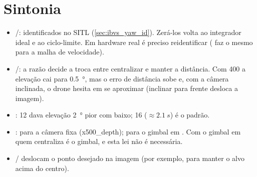 \section{Sintonia}
\begin{itemize}
  \item {}/: identificados no SITL
        (\autoref{sec:ibvs_yaw_id}). Zerá-los volta ao integrador ideal e ao ciclo-limite.
        Em hardware real é preciso reidentificar ( faz o mesmo para a
        malha de velocidade).
  \item {}/: a razão decide a troca entre centralizar e manter
        a distância. Com 400 a elevação cai para \SI{0,5}{\degree}, mas o erro de distância sobe e,
        com a câmera inclinada, o drone hesita em se aproximar (inclinar para frente desloca a imagem).
  \item {}: 12 dava elevação \SI{2}{\degree} pior com  baixo; 16
        ($\approx\SI{2,1}{s}$) é o padrão.
  \item {}:  para a câmera fixa (x500\_depth);  para o
        gimbal em . Com o gimbal em  quem centraliza é o gimbal, e esta lei
        não é necessária.
  \item {}/ deslocam o ponto desejado na imagem
        (por exemplo, para manter o alvo acima do centro).
\end{itemize}

